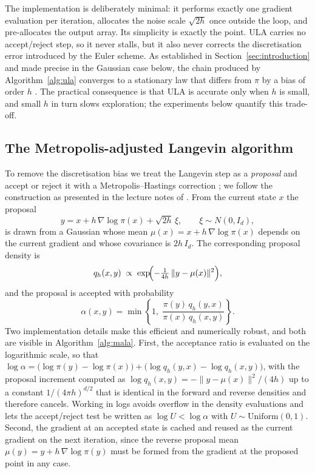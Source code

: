 \documentclass[a4paper,11pt, titlepage]{article}
\theoremstyle{definition}
\theoremstyle{plain}
\theoremstyle{remark}
\begin{document}
The implementation is deliberately minimal: it performs exactly one
gradient evaluation per iteration, allocates the noise scale
$\sqrt{2h}$ once outside the loop, and pre-allocates the output array.
Its simplicity is exactly the point. ULA carries no accept/reject step,
so it never stalls, but it also never corrects the discretisation error
introduced by the Euler scheme. As established in
Section~\ref{sec:introduction} and made precise in the Gaussian case
below, the chain produced by Algorithm~\ref{alg:ula} converges to a
stationary law that differs from $\pi$ by a bias of order $h$
\citep{Dalalyan2017, DurmusMoulines2017}. The practical consequence is
that ULA is accurate only when $h$ is small, and small $h$ in turn slows
exploration; the experiments below quantify this trade-off.

\subsection{The Metropolis-adjusted Langevin algorithm}
\label{sec:impl-mala}

To remove the discretisation bias we treat the Langevin step as a
\emph{proposal} and accept or reject it with a Metropolis--Hastings
correction \citep{RobertsTweedie1996}; we follow the construction as
presented in the lecture notes of \citet{Duncan2016}. From the current state $x$ the proposal
\begin{equation}
y = x + h\,\nabla\log\pi(x) + \sqrt{2h}\,\xi,
\qquad \xi\sim N(0,I_d),
\label{eq:impl-proposal}
\end{equation}
is drawn from a Gaussian whose mean
$\mu(x) = x + h\,\nabla\log\pi(x)$ depends on the current gradient and
whose covariance is $2h\,I_d$. The corresponding proposal density is
\[
q_h(x,y) \;\propto\; \exp\!\Bigl(-\tfrac{1}{4h}\,\|y-\mu(x)\|^2\Bigr),
\]
and the proposal is accepted with probability
\begin{equation}
\alpha(x,y) = \min\!\left\{1,\;
\frac{\pi(y)\,q_h(y,x)}{\pi(x)\,q_h(x,y)}\right\}.
\label{eq:impl-accept}
\end{equation}
Two implementation details make this efficient and numerically robust,
and both are visible in Algorithm~\ref{alg:mala}. First, the acceptance
ratio is evaluated on the logarithmic scale, so that
$\log\alpha = \bigl(\log\pi(y)-\log\pi(x)\bigr) + \bigl(\log q_h(y,x) -
\log q_h(x,y)\bigr)$, with the proposal increment computed as
$\log q_h(x,y) = -\|y-\mu(x)\|^2/(4h)$ up to a constant
$1/(4\pi h)^{d/2}$ that is identical in the forward and reverse
densities and therefore cancels. Working in logs avoids overflow in the
density evaluations and lets the accept/reject test be written as
$\log U < \log\alpha$ with $U\sim\mathrm{Uniform}(0,1)$. Second, the
gradient at an accepted state is cached and reused as the current
gradient on the next iteration, since the reverse proposal mean
$\mu(y) = y + h\,\nabla\log\pi(y)$ must be formed from the gradient at
the proposed point in any case.
\end{document}
